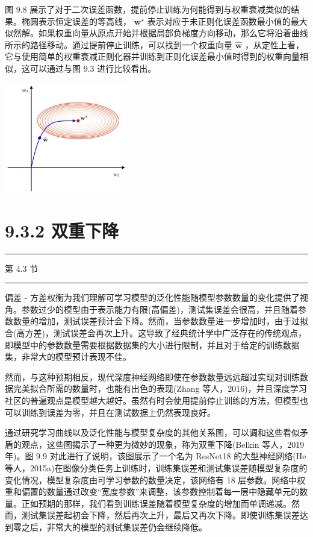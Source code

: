 \documentclass[10pt]{article}
\newcommand{\HRule}{\begin{center}\rule{0.9\linewidth}{0.2mm}\end{center}}
\begin{document}
图 9.8 展示了对于二次误差函数，提前停止训练为何能得到与权重衰减类似的结果。椭圆表示恒定误差的等高线， \({\mathbf{w}}^{ \star  }\) 表示对应于未正则化误差函数最小值的最大似然解。如果权重向量从原点开始并根据局部负梯度方向移动，那么它将沿着曲线所示的路径移动。通过提前停止训练，可以找到一个权重向量 \(\widehat{\mathbf{w}}\) ，从定性上看，它与使用简单的权重衰减正则化器并训练到正则化误差最小值时得到的权重向量相似，这可以通过与图 9.3 进行比较看出。

\begin{center}
\includegraphics[max width=0.4\textwidth]{images/0194e279-9b28-703a-88f4-c3ac21e2010d_287_944_349_607_546_0.jpg}
\end{center}
\hspace*{3em} 

\section*{9.3.2 双重下降}

\HRule

第 4.3 节

\HRule

偏差 - 方差权衡为我们理解可学习模型的泛化性能随模型参数数量的变化提供了视角。参数过少的模型由于表示能力有限(高偏差)，测试集误差会很高，并且随着参数数量的增加，测试误差预计会下降。然而，当参数数量进一步增加时，由于过拟合(高方差)，测试误差会再次上升。这导致了经典统计学中广泛存在的传统观点，即模型中的参数数量需要根据数据集的大小进行限制，并且对于给定的训练数据集，非常大的模型预计表现不佳。

然而，与这种预期相反，现代深度神经网络即使在参数数量远远超过实现对训练数据完美拟合所需的数量时，也能有出色的表现(Zhang 等人，2016)，并且深度学习社区的普遍观点是模型越大越好。虽然有时会使用提前停止训练的方法，但模型也可以训练到误差为零，并且在测试数据上仍然表现良好。

通过研究学习曲线以及泛化性能与模型复杂度的其他关系图，可以调和这些看似矛盾的观点，这些图揭示了一种更为微妙的现象，称为双重下降(Belkin 等人，2019 年)。图 9.9 对此进行了说明，该图展示了一个名为 ResNet18 的大型神经网络(He 等人，2015a)在图像分类任务上训练时，训练集误差和测试集误差随模型复杂度的变化情况，模型复杂度由可学习参数的数量决定，该网络有 18 层参数。网络中权重和偏置的数量通过改变“宽度参数”来调整，该参数控制着每一层中隐藏单元的数量。正如预期的那样，我们看到训练误差随着模型复杂度的增加而单调递减。然而，测试集误差起初会下降，然后再次上升，最后又再次下降。即使训练集误差达到零之后，非常大的模型的测试集误差仍会继续降低。
\end{document}
